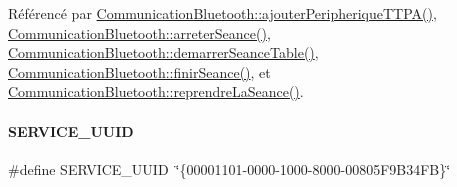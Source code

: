 Référencé par \hyperlink{class_communication_bluetooth_a53bc4772892ec57f030600e49fa0b6ff}{Communication\+Bluetooth\+::ajouter\+Peripherique\+T\+T\+P\+A()}, \hyperlink{class_communication_bluetooth_a4b0e71c1f161c14278f3ab55b1910c64}{Communication\+Bluetooth\+::arreter\+Seance()}, \hyperlink{class_communication_bluetooth_abb71c8f555c64d1791d330955ace417c}{Communication\+Bluetooth\+::demarrer\+Seance\+Table()}, \hyperlink{class_communication_bluetooth_ab2170ef9c868ac2a26b76675c71f770e}{Communication\+Bluetooth\+::finir\+Seance()}, et \hyperlink{class_communication_bluetooth_a1bcf85f34d2902ba6fe3b6929b409272}{Communication\+Bluetooth\+::reprendre\+La\+Seance()}.

\mbox{\label{terminal-_t_t_p_a_2communicationbluetooth_8h_a445125ee8c34695376c85f10b38844d6}} 
\paragraph{\texorpdfstring{S\+E\+R\+V\+I\+C\+E\+\_\+\+U\+U\+ID}{SERVICE\_UUID}}
{\footnotesize\ttfamily \#define S\+E\+R\+V\+I\+C\+E\+\_\+\+U\+U\+ID~\char`\"{}\{00001101-\/0000-\/1000-\/8000-\/00805\+F9\+B34\+F\+B\}\char`\"{}}

